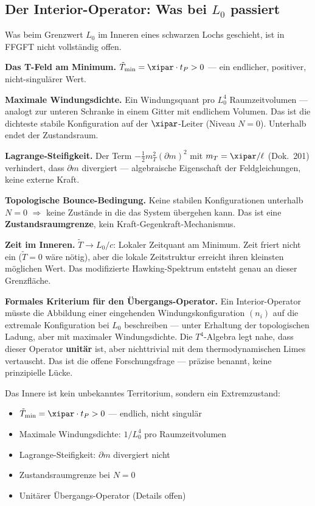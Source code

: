 \subsection{Der Interior-Operator: Was bei $L_0$ passiert}

Was beim Grenzwert $L_0$ im Inneren eines schwarzen Lochs geschieht, ist in FFGFT nicht vollständig offen.

\textbf{Das T-Feld am Minimum.}
$\tilde{T}_\text{min} = \xipar \cdot t_P > 0$ --- ein endlicher, positiver, nicht-singulärer Wert.

\textbf{Maximale Windungsdichte.}
Ein Windungsquant pro $L_0^4$ Raumzeitvolumen --- analogt zur unteren Schranke in einem Gitter mit endlichem Volumen. Das ist die dichteste stabile Konfiguration auf der $\xipar$-Leiter (Niveau $N = 0$). Unterhalb endet der Zustandsraum.

\textbf{Lagrange-Steifigkeit.}
Der Term $-\frac{1}{2}m_T^2(\partial m)^2$ mit $m_T = \xipar/\ell$ (Dok.~201) verhindert, dass $\partial m$ divergiert --- algebraische Eigenschaft der Feldgleichungen, keine externe Kraft.

\textbf{Topologische Bounce-Bedingung.}
Keine stabilen Konfigurationen unterhalb $N = 0$ $\Rightarrow$ keine Zustände in die das System übergehen kann. Das ist eine \textbf{Zustandsraumgrenze}, kein Kraft-Gegenkraft-Mechanismus.

\textbf{Zeit im Inneren.}
$\tilde{T} \rightarrow L_0/c$: Lokaler Zeitquant am Minimum. Zeit friert nicht ein ($\tilde{T} = 0$ wäre nötig), aber die lokale Zeitstruktur erreicht ihren kleinsten möglichen Wert. Das modifizierte Hawking-Spektrum entsteht genau an dieser Grenzfläche.

\textbf{Formales Kriterium für den Übergangs-Operator.}
Ein Interior-Operator müsste die Abbildung einer eingehenden Windungskonfiguration $(n_i)$ auf die extremale Konfiguration bei $L_0$ beschreiben --- unter Erhaltung der topologischen Ladung, aber mit maximaler Windungsdichte. Die $T^4$-Algebra legt nahe, dass dieser Operator \textbf{unitär} ist, aber nichttrivial mit dem thermodynamischen Limes vertauscht. Das ist die offene Forschungsfrage --- präzise benannt, keine prinzipielle Lücke.

\begin{erkenntnis}
Das Innere ist kein unbekanntes Territorium, sondern ein Extremzustand:
\begin{itemize}
  \item $\tilde{T}_\text{min} = \xipar \cdot t_P > 0$ --- endlich, nicht singulär
  \item Maximale Windungsdichte: $1/L_0^4$ pro Raumzeitvolumen
  \item Lagrange-Steifigkeit: $\partial m$ divergiert nicht
  \item Zustandsraumgrenze bei $N = 0$
  \item Unitärer Übergangs-Operator (Details offen)
\end{itemize}
\end{erkenntnis}

